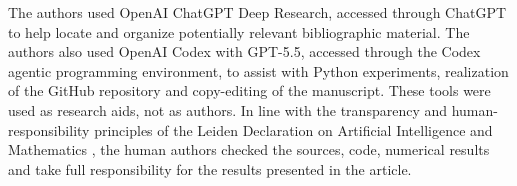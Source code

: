 \documentclass[reqno]{amsart}
\numberwithin{equation}{section}
\theoremstyle{definition}
\begin{document}
The authors used OpenAI ChatGPT Deep Research, accessed through ChatGPT to help locate and organize potentially relevant bibliographic material. The authors also used OpenAI Codex with GPT-5.5, accessed through the Codex agentic programming environment, to assist with Python experiments, realization of the GitHub repository and copy-editing of the manuscript. These tools were used as research aids, not as authors. In line with the transparency and human-responsibility principles of the Leiden Declaration on Artificial Intelligence and Mathematics \cite{leidendeclaration2026}, the human authors checked the sources, code, numerical results and take full responsibility for the results presented in the article.



\end{document}
